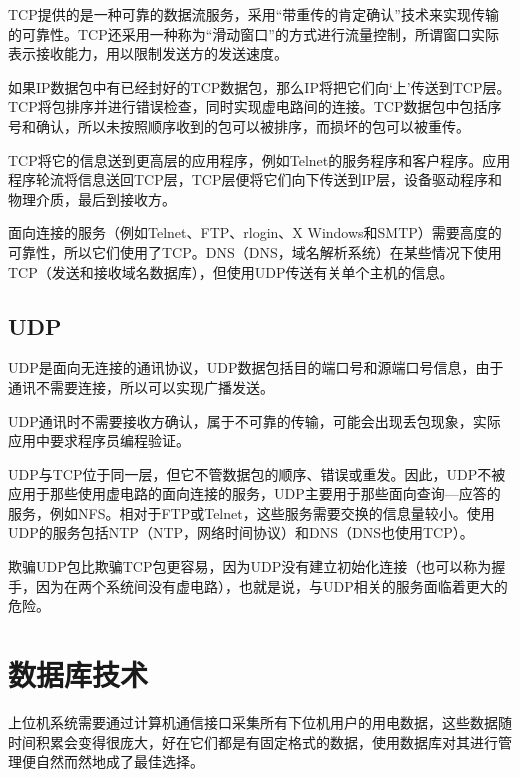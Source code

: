 TCP提供的是一种可靠的数据流服务，采用“带重传的肯定确认”技术来实现传输的可靠性。TCP还采用一种称为“滑动窗口”的方式进行流量控制，所谓窗口实际表示接收能力，用以限制发送方的发送速度。

如果IP数据包中有已经封好的TCP数据包，那么IP将把它们向‘上’传送到TCP层。TCP将包排序并进行错误检查，同时实现虚电路间的连接。TCP数据包中包括序号和确认，所以未按照顺序收到的包可以被排序，而损坏的包可以被重传。

TCP将它的信息送到更高层的应用程序，例如Telnet的服务程序和客户程序。应用程序轮流将信息送回TCP层，TCP层便将它们向下传送到IP层，设备驱动程序和物理介质，最后到接收方。

面向连接的服务（例如Telnet、FTP、rlogin、X Windows和SMTP）需要高度的可靠性，所以它们使用了TCP。\acrshort{DNS}（\acrlong{DNS}，域名解析系统）在某些情况下使用TCP（发送和接收域名数据库），但使用UDP传送有关单个主机的信息。

\subsection{UDP}
UDP是面向无连接的通讯协议，UDP数据包括目的端口号和源端口号信息，由于通讯不需要连接，所以可以实现广播发送。

UDP通讯时不需要接收方确认，属于不可靠的传输，可能会出现丢包现象，实际应用中要求程序员编程验证。

UDP与TCP位于同一层，但它不管数据包的顺序、错误或重发。因此，UDP不被应用于那些使用虚电路的面向连接的服务，UDP主要用于那些面向查询---应答的服务，例如NFS。相对于FTP或Telnet，这些服务需要交换的信息量较小。使用UDP的服务包括\acrshort{NTP}（\acrlong{NTP}，网络时间协议）和\acrshort{DNS}（\acrshort{DNS}也使用TCP）。

欺骗UDP包比欺骗TCP包更容易，因为UDP没有建立初始化连接（也可以称为握手，因为在两个系统间没有虚电路），也就是说，与UDP相关的服务面临着更大的危险。


\section{数据库技术}	
上位机系统需要通过计算机通信接口采集所有下位机用户的用电数据，这些数据随时间积累会变得很庞大，好在它们都是有固定格式的数据，使用数据库对其进行管理便自然而然地成了最佳选择。

